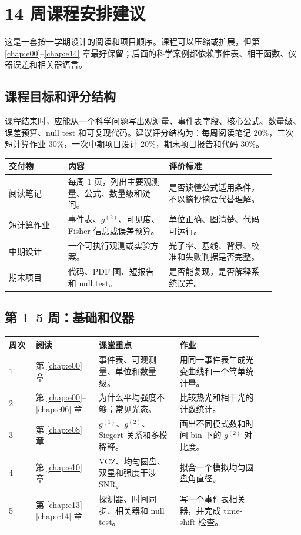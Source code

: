 \chapter{14 周课程安排建议}
\label{app:f}

这是一套按一学期设计的阅读和项目顺序。课程可以压缩或扩展，但第 \ref{chap:e00}--\ref{chap:e14} 章最好保留；后面的科学案例都依赖事件表、相干函数、仪器误差和相关器语言。

\section{课程目标和评分结构}
\label{appsec:f-goals}

课程结束时，应能从一个科学问题写出观测量、事件表字段、核心公式、数量级、误差预算、null test 和可复现代码。建议评分结构为：每周阅读笔记 \(20\%\)，三次短计算作业 \(30\%\)，一次中期项目设计 \(20\%\)，期末项目报告和代码 \(30\%\)。

\begin{longtable}{p{0.20\linewidth}p{0.34\linewidth}p{0.36\linewidth}}
\toprule
交付物 & 内容 & 评价标准 \\
\midrule
阅读笔记 & 每周 1 页，列出主要观测量、公式、数量级和疑问。 & 是否读懂公式适用条件，不以摘抄摘要代替理解。 \\
短计算作业 & 事件表、\(g^{(2)}\)、可见度、Fisher 信息或误差预算。 & 单位正确、图清楚、代码可运行。 \\
中期设计 & 一个可执行观测或实验方案。 & 光子率、基线、背景、校准和失败判据是否完整。 \\
期末项目 & 代码、PDF 图、短报告和 null test。 & 是否能复现，是否解释系统误差。 \\
\bottomrule
\end{longtable}

\section{第 1--5 周：基础和仪器}
\label{appsec:f-foundation}

\begin{longtable}{@{}p{0.09\linewidth}p{0.21\linewidth}p{0.27\linewidth}p{0.29\linewidth}@{}}
\toprule
周次 & 阅读 & 课堂重点 & 作业 \\
\midrule
1 & 第 \ref{chap:e00} 章 & 事件表、可观测量、单位和数量级。 & 用同一事件表生成光变曲线和一个简单统计量。 \\
2 & 第 \ref{chap:e00}--\ref{chap:e06} 章 & 为什么平均强度不够；常见光态。 & 比较热光和相干光的计数统计。 \\
3 & 第 \ref{chap:e08} 章 & \(g^{(1)}\)、\(g^{(2)}\)、Siegert 关系和多模稀释。 & 画出不同模式数和时间 bin 下的 \(g^{(2)}\) 对比度。 \\
4 & 第 \ref{chap:e10} 章 & VCZ、均匀圆盘、双星和强度干涉 SNR。 & 拟合一个模拟均匀圆盘角直径。 \\
5 & 第 \ref{chap:e13}--\ref{chap:e14} 章 & 探测器、时间同步、相关器和 null test。 & 写一个事件表相关器，并完成 time-shift 检查。 \\
\bottomrule
\end{longtable}

